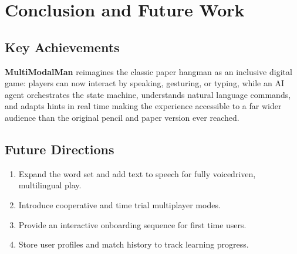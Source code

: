 \section{Conclusion and Future Work}

\subsection*{Key Achievements}

\textbf{MultiModalMan} reimagines the classic paper hangman as an inclusive digital game: players can now interact by speaking, gesturing, or typing, while an AI agent orchestrates the state machine, understands natural language commands, and adapts hints in real time making the experience accessible to a far wider audience than the original pencil and paper version ever reached.

\subsection*{Future Directions}
\vspace{-0.5em}
\begin{enumerate}
  \item Expand the word set and add text to speech for fully voicedriven, multilingual play.
  \item Introduce cooperative and time trial multiplayer modes.
  \item Provide an interactive onboarding sequence for first time users.
  \item Store user profiles and match history to track learning progress.
\end{enumerate}

